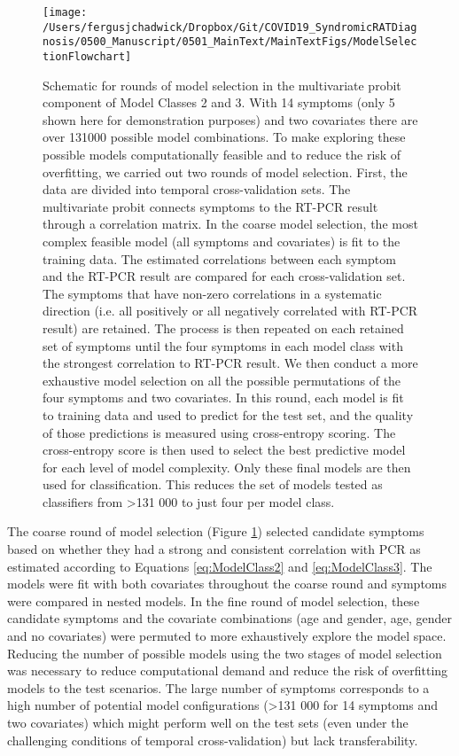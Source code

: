 \documentclass[]{elsarticle} %
\begin{document}
\begin{figure}
\texttt{[image: /Users/fergusjchadwick/Dropbox/Git/COVID19\_SyndromicRATDiagnosis/0500\_Manuscript/0501\_MainText/MainTextFigs/ModelSelectionFlowchart]} \caption{Schematic for rounds of model selection in the multivariate probit component of Model Classes 2 and 3. With 14 symptoms (only 5 shown here for demonstration purposes) and two covariates there are over 131000 possible model combinations. To make exploring these possible models computationally feasible and to reduce the risk of overfitting, we carried out two rounds of model selection. First, the data are divided into temporal cross-validation sets. The multivariate probit connects symptoms to the RT-PCR result through a correlation matrix. In the coarse model selection, the most complex feasible model (all symptoms and covariates) is fit to the training data. The estimated correlations between each symptom and the RT-PCR result are compared for each cross-validation set. The symptoms that have non-zero correlations in a systematic direction (i.e. all positively or all negatively correlated with RT-PCR result) are retained. The process is then repeated on each retained set of symptoms until the four symptoms in each model class with the strongest correlation to RT-PCR result. We then conduct a more exhaustive model selection on all the possible permutations of the four symptoms and two covariates. In this round, each model is fit to training data and used to predict for the test set, and the quality of those predictions is measured using cross-entropy scoring. The cross-entropy score is then used to select the best predictive model for each level of model complexity. Only these final models are then used for classification. This reduces the set of models tested as classifiers from >131 000 to just four per model class.}\label{fig:modsel-flowchart2}
\end{figure}

The coarse round of model selection (Figure \ref{fig:modsel-flowchart2}) selected candidate symptoms based on whether they had a strong and consistent correlation with PCR as estimated according to Equations \eqref{eq:ModelClass2} and \eqref{eq:ModelClass3}.
The models were fit with both covariates throughout the coarse round and symptoms were compared in nested models.
In the fine round of model selection, these candidate symptoms and the covariate combinations (age and gender, age, gender and no covariates) were permuted to more exhaustively explore the model space.
Reducing the number of possible models using the two stages of model selection was necessary to reduce computational demand and reduce the risk of overfitting models to the test scenarios.
The large number of symptoms corresponds to a high number of potential model configurations (\textgreater131 000 for 14 symptoms and two covariates) which might perform well on the test sets (even under the challenging conditions of temporal cross-validation) but lack transferability.
\end{document}
